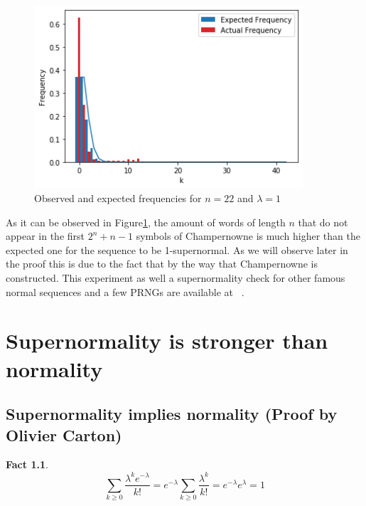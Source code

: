 \documentclass[11pt,a4paper]{tesis}
\newtheorem{fact}{Fact}[section]
\theoremstyle{definition}
\begin{document}
\begin{figure}[h]
    \includegraphics[width=10cm]{images/champ-22-freq.png}
    \centering
    \caption{Observed and expected frequencies for $n = 22$ and $\lambda = 1$}
    \label{fig:champ-22-freq}

\end{figure}

As it can be observed in Figure\ref{fig:champ-22-freq}, the amount of words of length $n$ that do not appear in the first $2^n + n - 1$ symbols of Champernowne is much higher than the expected one for the sequence to be 1-supernormal. As we will observe later in the proof this is due to the fact that by the way that Champernowne is constructed.
This experiment as well a supernormality check for other famous normal sequences and a few PRNGs are available at ~\cite{Puterman}.


\chapter{Supernormality is stronger than normality}
\section{Supernormality implies normality (Proof by Olivier Carton)}



\begin{fact}
    $$\sum_{k \geq 0} \frac{\lambda^ke^{-\lambda}}{k!} = e^{-\lambda}\sum_{k \geq 0} \frac{\lambda^k}{k!} = e^{-\lambda}e^{\lambda} = 1$$
\end{fact}
\end{document}
